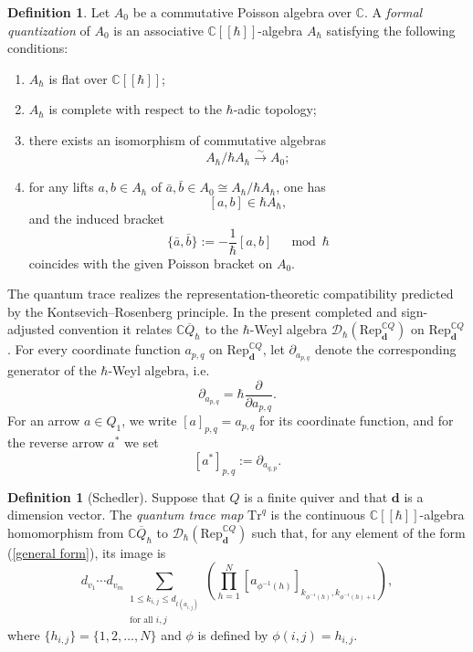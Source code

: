 \documentclass[11pt,reqno]{amsart}
\theoremstyle{definition}
\newtheorem{definition}[theorem]{Definition}
\newcommand{\bbC}{\mathbb{C}}
\newcommand{\Rep}{\mathrm{Rep}}
\newcommand{\bd}{\mathbf{d}}
\newcommand{\mD}{\mathcal{D}}
\newcommand{\qneck}{{\mathbb{C} \overline{Q}}_{\hbar}}
\begin{document}
\begin{definition}\label{def: quant Poi}
Let \(A_0\) be a commutative Poisson algebra over \(\bbC\).
A \emph{formal quantization} of \(A_0\) is an associative \(\bbC[[\hbar]]\)-algebra \(A_\hbar\) satisfying the following conditions:
\begin{enumerate}
\item \(A_\hbar\) is flat over \(\bbC[[\hbar]]\);

\item \(A_\hbar\) is complete with respect to the \(\hbar\)-adic topology;

\item there exists an isomorphism of commutative algebras
\[
A_\hbar/\hbar A_\hbar\xrightarrow{\sim}A_0;
\]
\item for any lifts \(a,b\in A_\hbar\) of \(\bar a,\bar b\in A_0 \cong A_\hbar/\hbar A_\hbar \), one has
\[
[a,b]\in\hbar A_\hbar,
\]
and the induced bracket
\begin{equation}\label{ pic}
\{\bar a,\bar b\}
:=
-\frac{1}{\hbar}[a,b]\quad\bmod\hbar
\end{equation}
coincides with the given Poisson bracket on \(A_0\).
\end{enumerate}
\end{definition}

The quantum trace realizes the representation-theoretic compatibility
predicted by the Kontsevich--Rosenberg principle.
In the present completed
and sign-adjusted convention it relates \(\qneck\) to the \(\hbar\)-Weyl
algebra \(\mD_\hbar (\Rep^{\bbC Q} _\bd)\) on \(\Rep^{\bbC Q}_\bd\).
For every coordinate function \(a_{p,q}\) on
\(\Rep^{\bbC Q}_{\mathbf d}\), let
\(\partial_{a_{p,q}}\) denote the corresponding generator of the
\(\hbar\)-Weyl algebra, i.e.
\[
\partial_{a_{p,q}}
=
\hbar\frac{\partial}{\partial a_{p,q}}.
\]
For an arrow \(a\in Q_1\), we write \([a]_{p,q} = a_{p,q}\) for its coordinate
function, and for the reverse arrow \(a^\ast \) we set
\[
[a^*]_{p,q}
:=
\partial_{a_{q,p}}.
\]



\begin{definition}[Schedler]\label{def: q trace map}
Suppose that $Q$ is a finite quiver and that $\mathbf{d}$ is a dimension vector. The \emph{quantum trace map} $\mathrm{Tr}^q$ is the continuous $\mathbb{C}[[\hbar]]$-algebra homomorphism from $\qneck$ to $\mathcal{D}_{\hbar}
	(\Rep^{\bbC Q} _\bd)$ such that, for any element of the form (\ref{general form}), its image is
	\begin{equation}
		d_{v_1}\cdots d_{v_{m}}
		\sum_{\substack{1\leq k_{i,j}\leq d_{t(a_{i,j})}\\
		                   \text{for all }i,j}}
		\left(\prod_{h=1} ^{N} [a_{\phi ^{-1}(h)}]_{k_{\phi^{-1}(h)},
			k_{\phi^{-1}(h)+1}}\right),\label{F.1}
	\end{equation}
where $\{ h_{i,j} \}=\{1,2,\ldots,N\}$ and $\phi$ is defined by $\phi(i,j)=h_{i,j}$.
\end{definition}
\end{document}
